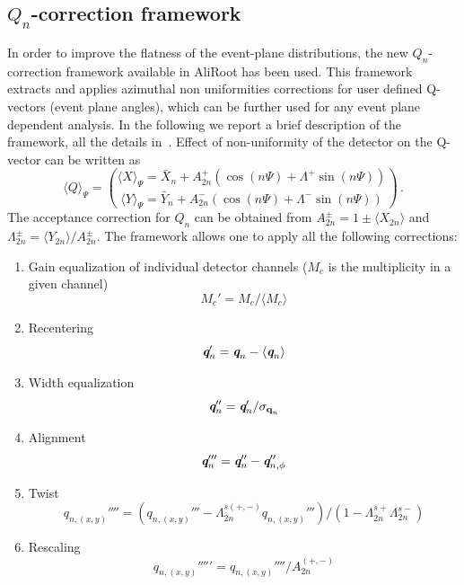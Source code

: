 \subsection{$Q_{n}$-correction framework}
In order to improve the flatness of the event-plane distributions, the
new $Q_n$-correction framework available in AliRoot
 has been used. This framework extracts and applies azimuthal non uniformities
corrections for user defined Q-vectors (event plane angles), which can
be further used for any event plane dependent analysis. In
the following we report a brief description of the framework, all the details
in~\cite{Selyuzhenkov:2007zi}. 
Effect of
non-uniformity of the detector on the Q-vector can be written as
\begin{equation}
\langle Q \rangle_{\Psi}={\langle X \rangle_{\Psi} =\bar{X}_n+A^+_{2n}(\cos
  (n\Psi)+\Lambda^+\sin (n\Psi))\choose \langle Y \rangle_{\Psi} =\bar{Y}_n+A^-_{2n}(\cos
  (n\Psi)+\Lambda^-\sin (n\Psi))}\,.
\end{equation}
The acceptance correction for $Q_n$ can be obtained from
$A^{\pm}_{2n}=1\pm \langle X_{2n} \rangle$ and $\Lambda^{\pm}_{2n}=
\langle Y_{2n} \rangle/A^{\pm}_{2n}$. The framework allows one to apply all the following corrections:
\begin{enumerate}
\item Gain equalization of individual detector channels ($M_c$ is the
  multiplicity in a given channel)
\begin{equation}
M_c' = M_c / \langle M_c \rangle
\end{equation}
\item Recentering
\begin{equation}
\emph{\textbf{q}}_n' = \emph{\textbf{q}}_n - \langle \emph{\textbf{q}}_n \rangle
\end{equation}
\item Width equalization
\begin{equation}
\emph{\textbf{q}}_n'' = \emph{\textbf{q}}_n' / \sigma_{\textbf{q}_n}
\end{equation}
\item Alignment
\begin{equation}
\emph{\textbf{q}}_n''' = \emph{\textbf{q}}_n'' - \emph{\textbf{q}}_{n,\phi}''
\end{equation}
\item Twist
\begin{equation}
q_{n,(x,y)}'''' = (q_{n,(x,y)}'''-\Lambda_{2n}^{s (+,-)}q_{n,(x,y)}''')/(1-\Lambda_{2n}^{s+}\Lambda_{2n}^{s-})
\end{equation}
\item Rescaling
\begin{equation}
q_{n,(x,y)}''''' = q_{n,(x,y)}''''/A_{2n}^{(+,-)}
\end{equation}
\end{enumerate}
